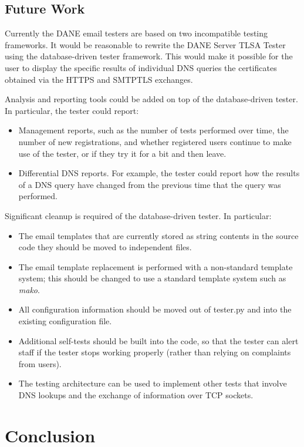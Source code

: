 \documentclass[preprint,3p,11pt]{elsarticle}
\begin{document}
\subsection{Future Work}

Currently the DANE email testers are based on two incompatible testing
frameworks. It would be reasonable to rewrite the DANE Server TLSA
Tester using the database-driven tester framework. This would make it
possible for the user to display the specific results of individual
DNS queries the certificates obtained via the HTTPS and SMTPTLS
exchanges. 

Analysis and reporting tools could be added on top of the
database-driven tester. In particular, the tester could report:
\begin{itemize}
\item Management reports, such as the number of tests performed over
  time, the number of new registrations, and whether registered users continue to
  make use of the tester, or if they try it for a bit and then leave.
\item Differential DNS reports. For example, the tester could report
  how the results of a DNS query have changed from the previous time
  that the query was performed.
\end{itemize}

Significant cleanup is required of the database-driven
tester. In particular:
\begin{itemize}
\item The email templates that are currently stored as string contents in
the source code they should be moved to independent files. 
\item The email template replacement is performed with a
non-standard template system; this should be changed to use a
standard template system such as \emph{mako}.
\item All configuration information should be moved out of tester.py
  and into the existing configuration file.
\item Additional self-tests should be built into the code, so that the
  tester can alert staff if the tester stops working properly (rather
  than relying on complaints from users).
\item The testing architecture can be used to implement other tests
  that involve DNS lookups and the exchange of information over TCP
  sockets.
\end{itemize}

\section{Conclusion}
\end{document}
